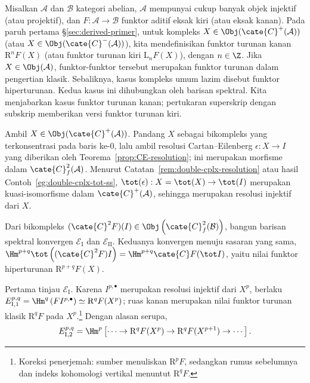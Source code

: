 \begin{example}
\label{eg:hyperderived-ss}
	Misalkan $\mathcal{A}$ dan $\mathcal{B}$ kategori abelian,
	$\mathcal{A}$ mempunyai cukup banyak objek injektif (atau projektif), dan
	$F:\mathcal{A}\to\mathcal{B}$ funktor aditif eksak kiri (atau eksak kanan).
	Pada paruh pertama \S\ref{sec:derived-primer}, untuk kompleks
	$X\in\Obj(\cate{C}^+(\mathcal{A}))$ (atau
	$X\in\Obj(\cate{C}^-(\mathcal{A}))$), kita mendefinisikan funktor turunan
	kanan $\mathrm{R}^nF(X)$ (atau funktor turunan kiri $\mathrm{L}_nF(X)$),
	dengan $n\in\Z$. Jika $X\in\Obj(\mathcal{A})$, funktor-funktor tersebut
	merupakan funktor turunan dalam pengertian klasik. Sebaliknya, kasus kompleks
	umum lazim disebut funktor hiperturunan. Kedua kasus ini dihubungkan oleh
	barisan spektral. Kita menjabarkan kasus funktor turunan kanan; pertukaran
	superskrip dengan subskrip memberikan versi funktor turunan kiri.

	Ambil $X\in\Obj(\cate{C}^+(\mathcal{A}))$. Pandang $X$ sebagai bikompleks
	yang terkonsentrasi pada baris ke-$0$, lalu ambil resolusi
	Cartan--Eilenberg $\epsilon:X\to I$ yang diberikan oleh
	Teorema~\ref{prop:CE-resolution}; ini merupakan morfisme dalam
	$\cate{C}^2_f(\mathcal{A})$. Menurut Catatan~\ref{rem:double-cplx-resolution}
	atau hasil Contoh~\ref{eg:double-cplx-tot-ss},
	$\tot(\epsilon):X=\tot(X)\to\tot(I)$ merupakan kuasi-isomorfisme dalam
	$\cate{C}^+(\mathcal{A})$, sehingga merupakan resolusi injektif dari $X$.

	Dari bikompleks
	$(\cate{C}^2F)(I)\in
	\Obj\left(\cate{C}^2_f(\mathcal{B})\right)$, bangun barisan spektral
	konvergen $\mathscr{E}_{\mathrm{I}}$ dan $\mathscr{E}_{\mathrm{II}}$.
	Keduanya konvergen menuju sasaran yang sama,
	$\Hm^{p+q}\tot\left((\cate{C}^2F)I\right)
	=\Hm^{p+q}\cate{C}F(\tot I)$, yaitu nilai funktor hiperturunan
	$\mathrm{R}^{p+q}F(X)$.

	Pertama tinjau $\mathscr{E}_{\mathrm{I}}$. Karena $I^{p,\bullet}$
	merupakan resolusi injektif dari $X^p$, berlaku
	$E_{\mathrm{I},1}^{p,q}=\Hm^q\left(FI^{p,\bullet}\right)
	\simeq\mathrm{R}^qF(X^p)$; ruas kanan merupakan nilai funktor turunan klasik
	$\mathrm{R}^qF$ pada $X^p$.\footnote{Koreksi penerjemah: sumber menuliskan
	$\mathrm{R}^pF$, sedangkan rumus sebelumnya dan indeks kohomologi vertikal
	menuntut $\mathrm{R}^qF$.} Dengan alasan serupa,
	\[ E_{\mathrm{I}, 2}^{p,q} = \Hm^p\left[ \cdots \to \mathrm{R}^q F(X^p) \to \mathrm{R}^q F(X^{p+1}) \to \cdots \right]. \]


\end{example}
